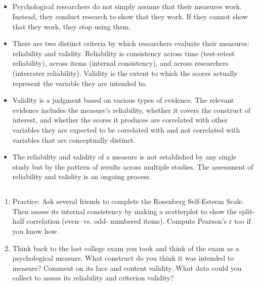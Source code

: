 \subsection{}
\begin{fullwidth}
\begin{itemize}

\item Psychological researchers do not simply assume that their measures work. Instead, they conduct research to show that they work. If they cannot show that they work, they stop using them.
\item There are two distinct criteria by which researchers evaluate their measures: reliability and
validity. Reliability is consistency across time (test-retest reliability), across items (internal consistency), and across researchers (interrater reliability). Validity is the extent to which the scores actually represent the variable they are intended to.
\item Validity is a judgment based on various types of evidence. The relevant evidence includes the measure's reliability, whether it covers the construct of interest, and whether the scores it produces are correlated with other variables they are expected to be correlated with and not correlated with variables that are conceptually distinct.
\item The reliability and validity of a measure is not established by any single study but by the pattern of results across multiple studies. The assessment of reliability and validity is an ongoing process.

\end{itemize}
\end{fullwidth}


\subsection{}
\begin{fullwidth}
\begin{enumerate}
\item Practice: Ask several friends to complete the Rosenberg Self-Esteem Scale. Then assess its internal consistency by making a scatterplot to show the split-half correlation (even- vs. odd- numbered items). Compute Pearson's r too if you know how.
\item Think back to the last college exam you took and think of the exam as a psychological measure. What construct do you think it was intended to measure? Comment on its face and content validity. What data could you collect to assess its reliability and criterion validity?
\end{enumerate}
\end{fullwidth}  

